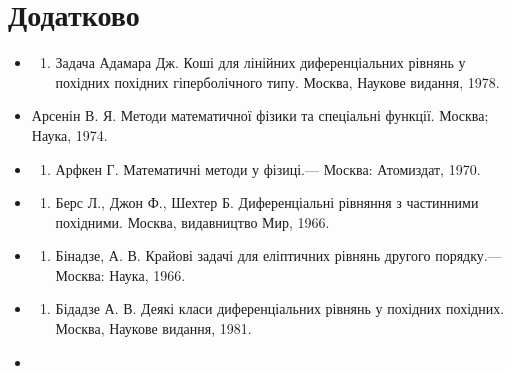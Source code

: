 \documentclass[
]{article}
\providecommand{\tightlist}{%
  \setlength{\itemsep}{0pt}\setlength{\parskip}{0pt}}
\begin{document}
{{{{\section{Додатково}\label{ux434ux43eux434ux430ux442ux43aux43eux432ux43e}

\begin{itemize}
\tightlist
\item
  \begin{enumerate}
  \def\labelenumi{\arabic{enumi}.}
  \setcounter{enumi}{6}
  \tightlist
  \item
    Задача Адамара Дж. Коші для лінійних диференціальних рівнянь у
    похідних похідних гіперболічного типу. Москва, Наукове видання,
    1978.
  \end{enumerate}
\item
  Арсенін В. Я. Методи математичної фізики та спеціальні функції.
  Москва; Наука, 1974.
\item
  \begin{enumerate}
  \def\labelenumi{\arabic{enumi}.}
  \setcounter{enumi}{8}
  \tightlist
  \item
    Арфкен Г. Математичні методи у фізиці.--- Москва: Атомиздат, 1970.
  \end{enumerate}
\item
  \begin{enumerate}
  \def\labelenumi{\arabic{enumi}.}
  \setcounter{enumi}{9}
  \tightlist
  \item
    Берс Л., Джон Ф., Шехтер Б. Диференціальні рівняння з частинними
    похідними. Москва, видавництво Мир, 1966.
  \end{enumerate}
\item
  \begin{enumerate}
  \def\labelenumi{\arabic{enumi}.}
  \setcounter{enumi}{10}
  \tightlist
  \item
    Бінадзе, А. В. Крайові задачі для еліптичних рівнянь другого
    порядку.--- Москва: Наука, 1966.
  \end{enumerate}
\item
  \begin{enumerate}
  \def\labelenumi{\arabic{enumi}.}
  \setcounter{enumi}{11}
  \tightlist
  \item
    Бідадзе А. В. Деякі класи диференціальних рівнянь у похідних
    похідних. Москва, Наукове видання, 1981.
  \end{enumerate}
\item
  \begin{enumerate}
  \def\labelenumi{\arabic{enumi}.}
  \setcounter{enumi}{12}

\end{enumerate}
\end{itemize}}}}}
\end{document}
